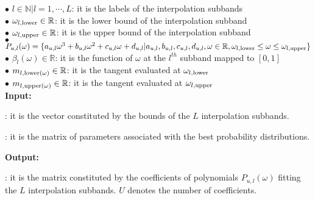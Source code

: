 \begin{algorithm}[h!]
	\small
	\hspace{0.1cm}$\bullet$ $l\in \mathbb{N}|l=1, \cdots, L$: it is the labels of the interpolation subbands\\
	\hspace{0.1cm}$\bullet$ $\omega_{l,\textnormal{lower}} \in \mathbb{R}$: it is the lower bound of the interpolation subband\\
	\hspace{0.1cm}$\bullet$ $\omega_{l,\textnormal{upper}} \in \mathbb{R}$: it is the upper bound of the interpolation subband\\
	\hspace{0.1cm}$\bullet$ $P_{u,l}(\omega)=\{a_{u,l}\omega^3+b_{u,l}\omega^2+c_{u,l}\omega+d_{u,l} |a_{u,l}, b_{u,l}, c_{u,l}, d_{u,l}, \omega \in \mathbb{R}, \omega_{l,\textnormal{lower}} \leq \omega \leq \omega_{l,\textnormal{upper}}\}$\\ 
	\hspace{0.1cm}$\bullet$ $\beta_l(\omega) \in \mathbb{R}$: it is the function of $\omega$ at the $l^{th}$ subband mapped to $[0,1]$\\
	\hspace{0.1cm}$\bullet$ $m_{l,\textnormal{lower}(\omega)}\in \mathbb{R}$: it is the tangent evaluated at $\omega_{l,\textnormal{lower}}$\\
	\hspace{0.1cm}$\bullet$ $m_{l,\textnormal{upper}(\omega)} \in \mathbb{R}$: it is the tangent evaluated at $\omega_{l,\textnormal{upper}}$\\
	
	
	\textbf{Input:}\\
	\begin{description}[font=\normalfont, align=left, labelindent=0.2cm] 
		\item[$\mathbf{v}\in \mathbb{R}^{(L+1) \times 1}$]: it is  the vector constituted by the bounds of the $L$ interpolation subbands.
		\item[$\mathbf{M}_{\theta}\in \mathbb{R}^{U \times N}$]: it is the matrix of parameters associated with the best probability distributions.
	\end{description}
	\textbf{Output:}\\
	\begin{description}[font=\normalfont, align=left, labelindent=0.2cm]
		\item[$\mathbf{M}_P\in \mathbb{R}^{4U \times L}$]: it is the matrix constituted by the coefficients of polynomials $P_{u,l}(\omega)$ fitting the $L$ interpolation subbands. $U$ denotes the number of coefficients.
		

\end{description}
\end{algorithm}
